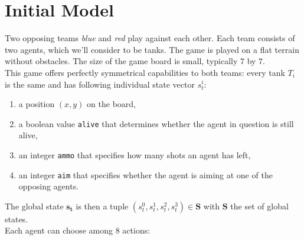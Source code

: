 \section{Initial Model}
\label{sec:first_model}
Two opposing teams \emph{blue} and \emph{red} play against each other. Each team consists of two agents, which we'll consider to be tanks. The game is played on a flat terrain without obstacles. The size of the game board is small, typically $7$ by $7$.\\
This game offers perfectly symmetrical capabilities to both teams: every tank $T_i$ is the same and has following individual state vector $s^i_t$:
\begin{enumerate}
    \item a position $(x,y)$ on the board,
    \item a boolean value {\tt alive} that determines whether the agent in question is still alive,
    \item an integer {\tt ammo} that specifies how many shots an agent has left,
    \item an integer {\tt aim} that specifies whether the agent is aiming at one of the opposing agents.
\end{enumerate}
The global state $\bm{s_t}$ is then a tuple $(s_t^0, s_t^1, s_t^2, s_t^3) \in \bm{S}$ with $\bm{S}$ the set of global states.\\
Each agent can choose among $8$ actions:
